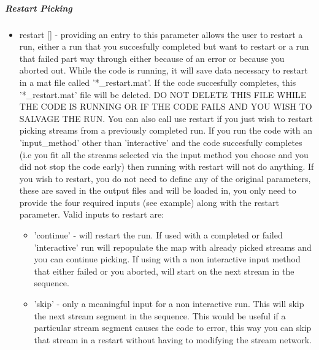 \subparagraph{Restart Picking}
\begin{itemize}
	\item restart [] - providing an entry to this parameter allows the user to restart a run, either a run that you succesfully completed
	but want to restart or a run that failed part way through either because of an error or because you aborted out. While 
	the code is running, it will save data necessary to restart in a mat file called '*\_restart.mat'. If the code succesfully
	completes, this '*\_restart.mat' file will be deleted. DO NOT DELETE THIS FILE WHILE THE CODE IS RUNNING OR IF THE CODE FAILS
	AND YOU WISH TO SALVAGE THE RUN. You can also call use restart if you just wish to restart picking streams from a previously 
	completed run. If you run the code with an 'input\_method' other than 'interactive' and the code succesfully completes (i.e
	you fit all the streams selected via the input method you choose and you did not stop the code early) then running with restart
	will not do anything. If you wish to restart, you do not need to define any of the original parameters, these are saved in the
	output files and will be loaded in, you only need to provide the four required inputs (see example) along with the restart parameter. 
	Valid inputs to restart are:
	\begin{itemize}
		\item 'continue' - will restart the run. If used with a completed or failed 'interactive' run will repopulate the map with already picked 
		streams and you can continue picking. If using with a non interactive input method that either failed or you aborted, will start 
		on the next stream in the sequence.
		\item 'skip' - only a meaningful input for a non interactive run. This will skip the next stream segment in the sequence. This would be useful
		if a particular stream segment causes the code to error, this way you can skip that stream in a restart without having to modifying
		the stream network.
	\end{itemize}
\end{itemize}


